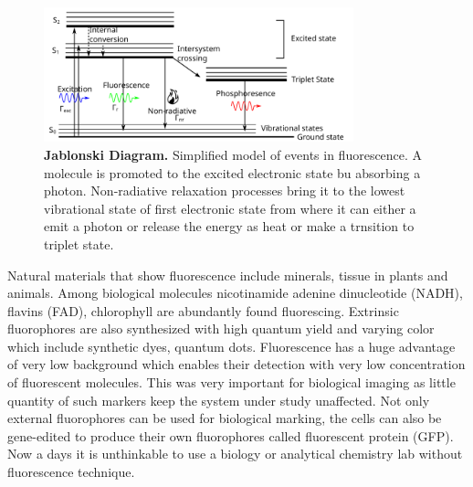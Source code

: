 \documentclass[11pt,a4paper,onecolumn]{article}
\begin{document}
\begin{figure}
	\centering
	\includegraphics[width=0.8\textwidth]{jablonski}
	\caption{\textbf{Jablonski Diagram.} Simplified model of events in fluorescence. A molecule is promoted to the excited electronic state bu absorbing a photon. Non-radiative relaxation processes bring it to the lowest vibrational state of first electronic state from where it can either a emit a photon or release the energy as heat or make a trnsition to triplet state.}
	\label{fig:jablonski}
\end{figure}

Natural materials that show fluorescence include minerals, tissue in plants and animals.
Among biological molecules nicotinamide adenine dinucleotide (NADH), flavins (FAD), chlorophyll are abundantly found fluorescing.
Extrinsic fluorophores are also synthesized with high quantum yield and varying color which include synthetic dyes, quantum dots.
Fluorescence has a huge advantage of very low background which enables their detection with very low concentration of fluorescent molecules.
This was very important for biological imaging as little quantity of such markers keep the system under study unaffected.
Not only external fluorophores can be used for biological marking, the cells can also be gene-edited to produce their own fluorophores called fluorescent protein (GFP).
Now a days it is unthinkable to use a biology or analytical chemistry lab without fluorescence technique.
\end{document}
